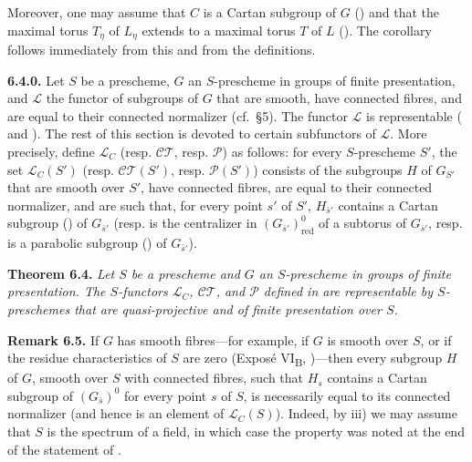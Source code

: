 Moreover, one may assume that \(C\) is a Cartan subgroup of \(G\) () and that the maximal torus \(T_{\eta}\) of \(L_{\eta}\)
extends to a maximal torus \(T\) of \(L\) (). The corollary follows immediately from this and from the definitions.

\textbf{6.4.0.} Let \(S\) be a prescheme, \(G\) an \(S\)-prescheme in groups of finite
presentation, and \(\mathcal{L}\) the functor of subgroups of \(G\) that are smooth,
have connected fibres, and are equal to their connected normalizer (cf.~§5).
The functor \(\mathcal{L}\) is representable ( and ). The rest of this section
is devoted to certain subfunctors of \(\mathcal{L}\). More precisely, define
\(\mathcal{L}_{C}\) (resp. \(\mathcal{CT}\), resp. \(\mathcal{P}\)) as follows:
for every \(S\)-prescheme \(S'\), the set \(\mathcal{L}_{C}(S')\)
(resp. \(\mathcal{CT}(S')\), resp. \(\mathcal{P}(S')\)) consists of the subgroups
\(H\) of \(G_{S'}\) that are smooth over \(S'\), have connected fibres, are equal
to their connected normalizer, and are such that, for every point \(s'\) of \(S'\),
\(H_{\bar s'}\) contains a Cartan subgroup () of \(G_{\bar s'}\)
(resp. is the centralizer in \((G_{\bar s'})^{0}_{\mathrm{red}}\) of a subtorus of
\(G_{\bar s'}\), resp. is a parabolic subgroup () of \(G_{\bar s'}\)).

\textbf{Theorem 6.4.} \emph{Let \(S\) be a prescheme and \(G\) an \(S\)-prescheme in
groups of finite presentation. The \(S\)-functors \(\mathcal{L}_{C}\),
\(\mathcal{CT}\), and \(\mathcal{P}\) defined in  are representable by
\(S\)-preschemes that are quasi-projective and of finite presentation over \(S\).}

\textbf{Remark 6.5.} If \(G\) has smooth fibres---for example, if \(G\) is smooth
over \(S\), or if the residue characteristics of \(S\) are zero
(Exposé VI\textsubscript{B}, )---then every subgroup \(H\) of \(G\), smooth over
\(S\) with connected fibres, such that \(H_s\) contains a Cartan subgroup of
\((G_{\bar s})^0\) for every point \(s\) of \(S\), is necessarily equal to its connected
normalizer (and hence is an element of \(\mathcal{L}_{C}(S)\)). Indeed, by  iii)
we may assume that \(S\) is the spectrum of a field, in which case the property was
noted at the end of the statement of .

